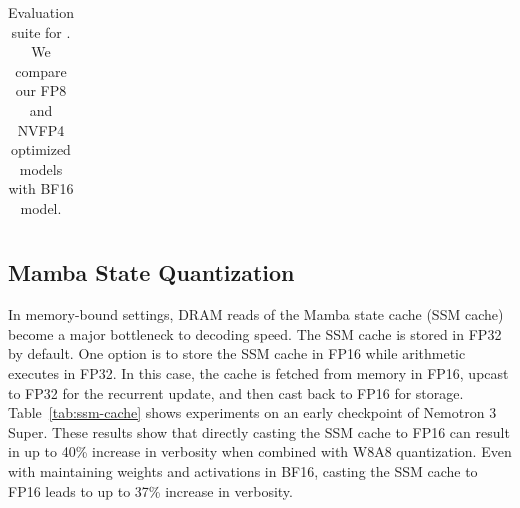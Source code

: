 \begin{table}[h!]
\begin{tabular}{l|c c c}
\bottomrule
\end{tabular}

\caption{
Evaluation suite for \ourmodel. We compare our \textsc{FP8} and \textsc{NVFP4} optimized models with BF16 model.
}
\label{tab:quant_comparison}
\end{table} 


\subsection{Mamba State Quantization}

In memory-bound settings, DRAM reads of the Mamba state cache (SSM cache) become a major bottleneck to decoding speed. The SSM cache is stored in FP32 by default. One option is to store the SSM cache in FP16 while arithmetic executes in FP32. In this case, the cache is fetched from memory in FP16, upcast to FP32 for the recurrent update, and then cast back to FP16 for storage. Table~\ref{tab:ssm-cache} shows experiments on an early checkpoint of Nemotron 3 Super. These results show that directly casting the SSM cache to FP16 can result in up to 40\% increase in verbosity when combined with W8A8 quantization. Even with maintaining weights and activations in BF16, casting the SSM cache to FP16 leads to up to 37\% increase in verbosity.

